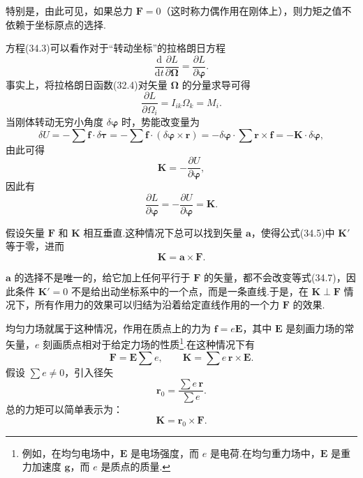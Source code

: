 特别是，由此可见，如果总力 $\boldsymbol{F}=0$（这时称力偶作用在刚体上），则力矩之值不依赖于坐标原点的选择.

方程(34.3)可以看作对于“转动坐标”的拉格朗日方程
\begin{equation*}
  \frac{\mathrm{d}}{\mathrm{d}t}\frac{\partial L}{\partial\boldsymbol{\Omega}}
  =\frac{\partial L}{\partial\boldsymbol{\varphi}}.
\end{equation*}
事实上，将拉格朗日函数(32.4)对矢量 $\boldsymbol{\Omega}$ 的分量求导可得
\begin{equation*}
  \frac{\partial L}{\partial\Omega_i}=I_{ik}\Omega_k=M_i.
\end{equation*}
当刚体转动无穷小角度 $\delta\boldsymbol{\varphi}$ 时，势能改变量为
\begin{equation*}
  \delta U=-\sum\boldsymbol{f}\cdot\delta\boldsymbol{\tau}
  =-\sum\boldsymbol{f}\cdot(\delta\boldsymbol{\varphi}\times\boldsymbol{r})
  =-\delta\boldsymbol{\varphi}\cdot\sum\boldsymbol{r}\times\boldsymbol{f}
  =-\boldsymbol{K}\cdot\delta\boldsymbol{\varphi},
\end{equation*}
由此可得
\begin{equation}
  \boldsymbol{K}=-\frac{\partial U}{\partial\boldsymbol{\varphi}},
\end{equation}
因此有
\begin{equation*}
  \frac{\partial L}{\partial\boldsymbol{\varphi}}
  =-\frac{\partial U}{\partial\boldsymbol{\varphi}}=\boldsymbol{K}.
\end{equation*}

假设矢量 $\boldsymbol{F}$ 和 $\boldsymbol{K}$ 相互垂直.这种情况下总可以找到矢量 $\boldsymbol{a}$，使得公式(34.5)中 $\boldsymbol{K}'$ 等于零，进而
\begin{equation}
  \boldsymbol{K}=\boldsymbol{a}\times\boldsymbol{F}.
\end{equation}

$\boldsymbol{a}$ 的选择不是唯一的，给它加上任何平行于 $\boldsymbol{F}$ 的矢量，都不会改变等式(34.7)，因此条件 $\boldsymbol{K}'=0$ 不是给出动坐标系中的一个点，而是一条直线.于是，在
$\boldsymbol{K}\perp\boldsymbol{F}$ 情况下，所有作用力的效果可以归结为沿着给定直线作用的一个力 $\boldsymbol{F}$ 的效果.

均匀力场就属于这种情况，作用在质点上的力为 $\boldsymbol{f}=e\boldsymbol{E}$，其中 $\boldsymbol{E}$ 是刻画力场的常矢量，$e$ 刻画质点相对于给定力场的性质\footnote{例如，在均匀电场中，$\boldsymbol{E}$ 是电场强度，而 $e$ 是电荷.在均匀重力场中，$\boldsymbol{E}$ 是重力加速度 $\boldsymbol{g}$，而 $e$ 是质点的质量.}.在这种情况下有
\begin{equation*}
  \boldsymbol{F}=\boldsymbol{E}\sum e,
  \qquad
  \boldsymbol{K}=\sum e\,\boldsymbol{r}\times\boldsymbol{E}.
\end{equation*}
假设 $\sum e\neq0$，引入径矢
\begin{equation}
  \boldsymbol{r}_0=\frac{\sum e\,\boldsymbol{r}}{\sum e}.
\end{equation}
总的力矩可以简单表示为：
\begin{equation}
  \boldsymbol{K}=\boldsymbol{r}_0\times\boldsymbol{F}.
\end{equation}

